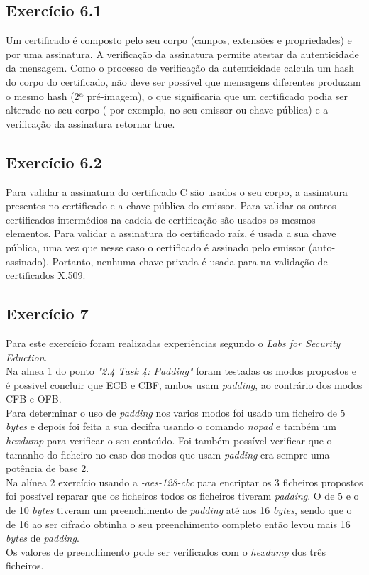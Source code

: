 \documentclass[11pt]{report}
\begin{document}
\subsection{Exercício 6.1}
Um certificado é composto pelo seu corpo (campos, extensões e propriedades) e por uma assinatura. A verificação da assinatura permite atestar da autenticidade da mensagem.
Como o processo de verificação da autenticidade calcula um hash do corpo do certificado, não deve ser possível que mensagens diferentes produzam o mesmo hash (2ª pré-imagem), o que significaria que um certificado podia ser alterado no seu corpo ( por exemplo, no seu emissor ou chave pública) e a verificação da assinatura retornar true.\\

\subsection{Exercício 6.2}
Para validar a assinatura do certificado C são usados o seu corpo, a assinatura presentes no certificado e a chave pública do emissor. Para validar os outros certificados intermédios na cadeia de certificação são usados os mesmos elementos. Para validar a assinatura do certificado raíz, é usada a sua chave pública, uma vez que nesse caso o certificado é assinado pelo emissor (auto-assinado). Portanto, nenhuma chave privada é usada para na validação de certificados X.509.\\

\subsection{Exercício 7}
Para este exercício foram realizadas experiências segundo o \textit{Labs for Security Eduction}.\\
Na alnea 1 do ponto \emph{"2.4 Task 4: Padding"} foram testadas os modos propostos e é possivel concluir que ECB e CBF, ambos usam \textit{padding}, ao contrário dos modos CFB e OFB.\\
Para determinar o uso de \textit{padding} nos varios modos foi usado um ficheiro de 5 \textit{bytes} e depois foi feita a sua decifra usando o comando \textit{nopad} e também um \textit{hexdump} para verificar o seu conteúdo. Foi também possível verificar que o tamanho do ficheiro no caso dos modos que usam \textit{padding} era sempre uma potência de base 2.\\

Na alínea 2 exercício usando a \textit{-aes-128-cbc} para encriptar os 3 ficheiros propostos foi possível reparar que os ficheiros todos os ficheiros tiveram \textit{padding}. O de 5 e o de 10 \textit{bytes} tiveram um preenchimento de \textit{padding} até aos 16  \textit{bytes}, sendo que o de 16 ao ser cifrado obtinha o seu preenchimento completo então levou mais 16 \textit{bytes} de \textit{padding}.\\ 
Os valores de preenchimento pode ser verificados com o \textit{hexdump} dos três ficheiros.
\end{document}

